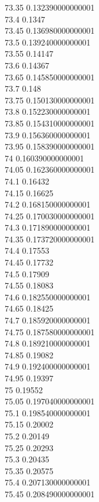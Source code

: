 {73.35	0.132390000000001\\
73.4	0.1347\\
73.45	0.136980000000001\\
73.5	0.139240000000001\\
73.55	0.14147\\
73.6	0.14367\\
73.65	0.145850000000001\\
73.7	0.148\\
73.75	0.150130000000001\\
73.8	0.152230000000001\\
73.85	0.154310000000001\\
73.9	0.156360000000001\\
73.95	0.158390000000001\\
74	0.160390000000001\\
74.05	0.162360000000001\\
74.1	0.16432\\
74.15	0.16625\\
74.2	0.168150000000001\\
74.25	0.170030000000001\\
74.3	0.171890000000001\\
74.35	0.173720000000001\\
74.4	0.17553\\
74.45	0.17732\\
74.5	0.17909\\
74.55	0.18083\\
74.6	0.182550000000001\\
74.65	0.18425\\
74.7	0.185920000000001\\
74.75	0.187580000000001\\
74.8	0.189210000000001\\
74.85	0.19082\\
74.9	0.192400000000001\\
74.95	0.19397\\
75	0.19552\\
75.05	0.197040000000001\\
75.1	0.198540000000001\\
75.15	0.20002\\
75.2	0.20149\\
75.25	0.20293\\
75.3	0.20435\\
75.35	0.20575\\
75.4	0.207130000000001\\
75.45	0.208490000000001\\
}
